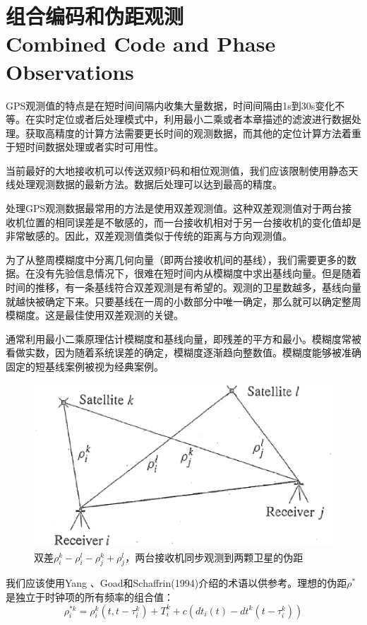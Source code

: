 \section[组合编码和伪距观测]{组合编码和伪距观测\\Combined Code and Phase Observations}

GPS观测值的特点是在短时间间隔内收集大量数据，时间间隔由1s到30s变化不等。在实时定位或者后处理模式中，利用最小二乘或者本章描述的滤波进行数据处理。获取高精度的计算方法需要更长时间的观测数据，而其他的定位计算方法着重于短时间数据处理或者实时可用性。

当前最好的大地接收机可以传送双频P码和相位观测值，我们应该限制使用静态天线处理观测数据的最新方法。数据后处理可以达到最高的精度。

处理GPS观测数据最常用的方法是使用双差观测值。这种双差观测值对于两台接收机位置的相同误差是不敏感的，而一台接收机相对于另一台接收机的变化值却是非常敏感的。因此，双差观测值类似于传统的距离与方向观测值。

为了从整周模糊度中分离几何向量（即两台接收机间的基线），我们需要更多的数据。在没有先验信息情况下，很难在短时间内从模糊度中求出基线向量。但是随着时间的推移，有一条基线符合双差观测是有希望的。观测的卫星数越多，基线向量就越快被确定下来。只要基线在一周的小数部分中唯一确定，那么就可以确定整周模糊度。这是最佳使用双差观测的关键。

通常利用最小二乘原理估计模糊度和基线向量，即残差的平方和最小。模糊度常被看做实数，因为随着系统误差的确定，模糊度逐渐趋向整数值。模糊度能够被准确固定的短基线案例被视为经典案例。

\begin{figure}
	\centering
	\includegraphics[width=0.4\linewidth]{TeX_files/Part03/chapter10/image/9-2}
	\caption{双差$\rho_{i}^{k}-\rho_{i}^{l}-\rho_{j}^{k}+\rho_{j}^{l}$，两台接收机同步观测到两颗卫星的伪距}
	\label{fig:9-2}
\end{figure}

我们应该使用Yang 、Goad和Schaffrin(1994)介绍的术语以供参考。理想的伪距$\rho^{*}$是独立于时钟项的所有频率的组合值：
\begin{equation}
	\rho_{i}^{*k}=\rho_{i}^{k}(t,t-\tau_{i}^{k})+T_{i}^{k}+c(dt_{i}(t)-dt^{k}(t-\tau_{i}^{k}))
\end{equation}

